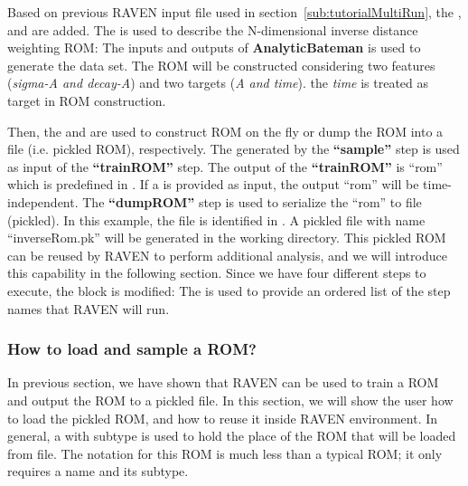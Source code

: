 Based on previous RAVEN input file used in section~\ref{sub:tutorialMultiRun}, the , 
and  are added. The  is used to describe the N-dimensional inverse distance weighting
ROM:
The inputs and outputs of \textbf{AnalyticBateman} is used to generate the data set. The ROM will be constructed considering
two features (\textit{sigma-A and decay-A}) and two targets (\textit{A and time}). \nb the \textit{time} is treated
as target in ROM construction.

Then, the  and  are used to construct ROM on the fly or dump the ROM into a file
(i.e. pickled ROM), respectively.
The  generated by the \textbf{``sample''} step is used as input of the \textbf{``trainROM''}
step. The output of the \textbf{``trainROM''} is ``rom'' which is predefined in . If a 
is provided as input, the output ``rom'' will be time-independent. The \textbf{``dumpROM''} step is used to serialize
the ``rom'' to file (pickled). In this example, the file is identified in .
A pickled file with name ``inverseRom.pk'' will be generated in the working directory. This pickled ROM can be
reused by RAVEN to perform additional analysis, and we will introduce this capability in the following section.
Since we have four different steps to execute, the  block is modified:
The  is used to provide an ordered list of the step names that RAVEN will run.

\subsubsection{How to load and sample a ROM?}
In previous section, we have shown that RAVEN can be used to train a ROM and output the ROM to a pickled file. In
this section, we will show the user how to load the pickled ROM, and how to reuse it inside RAVEN environment.
In general, a  with subtype  is used to hold the place of the ROM that will be
loaded from file. The notation for this ROM is much less than a typical ROM; it only requires a name and its subtype.

